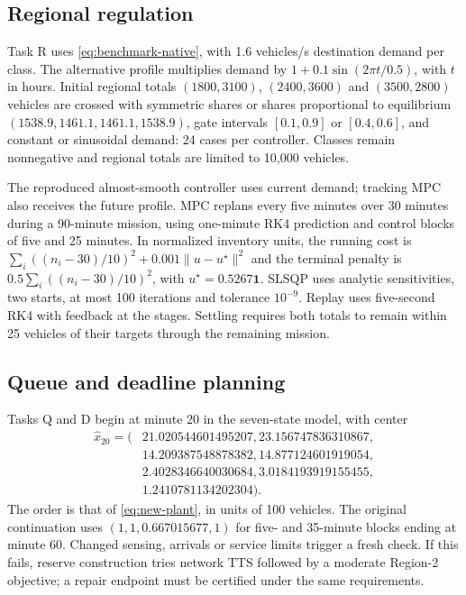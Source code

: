 \subsection{Regional regulation}
Task R uses \eqref{eq:benchmark-native}, with 1.6 vehicles/s destination
demand per class. The alternative profile multiplies demand by
$1+0.1\sin(2\pi t/0.5)$, with $t$ in hours. Initial regional totals
$(1800,3100)$, $(2400,3600)$ and $(3500,2800)$ vehicles are crossed with
symmetric shares or shares proportional to equilibrium
$(1538.9,1461.1,1461.1,1538.9)$, gate intervals $[0.1,0.9]$ or $[0.4,0.6]$,
and constant or sinusoidal demand: 24 cases per controller. Classes remain
nonnegative and regional totals are limited to 10,000 vehicles.

The reproduced almost-smooth controller uses current demand; tracking MPC
also receives the future profile. MPC replans every five minutes over
30 minutes during a 90-minute mission, using one-minute RK4 prediction
and control blocks of five and 25 minutes. In normalized inventory units,
the running cost is $\sum_i((n_i-30)/10)^2+0.001\|u-u^\star\|^2$ and the
terminal penalty is $0.5\sum_i((n_i-30)/10)^2$, with
$u^\star=0.5267\mathbf1$. SLSQP uses analytic sensitivities, two starts,
at most 100 iterations and tolerance $10^{-9}$. Replay uses five-second RK4 with
feedback at the stages. Settling requires both totals to remain within
25 vehicles of their targets through the remaining mission.

\subsection{Queue and deadline planning}
\label{sec:supp-queue-settings}
Tasks Q and D begin at minute 20 in the seven-state model, with center
\[
\begin{aligned}
\widehat x_{20}=(&21.020544601495207,23.156747836310867,\\
&14.209387548878382,14.877124601919054,\\
&2.4028346640030684,3.0184193919155455,\\
&1.2410781134202304).
\end{aligned}
\]
The order is that of \eqref{eq:new-plant}, in units of 100 vehicles. The
original continuation uses $(1,1,0.667015677,1)$ for five- and 35-minute
blocks ending at minute 60. Changed sensing, arrivals or service limits
trigger a fresh check. If this fails, reserve construction tries network
TTS followed by a moderate Region-2 objective; a repair endpoint must be
certified under the same requirements.

